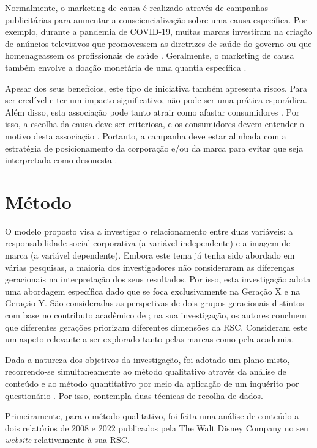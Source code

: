 \documentclass[portuguese]{textolivre}
\begin{document}
Normalmente, o marketing de causa é realizado através de campanhas publicitárias para aumentar a consciencialização sobre uma causa específica. Por exemplo, durante a pandemia de COVID-19, muitas marcas investiram na criação de anúncios televisivos que promovessem as diretrizes de saúde do governo ou que homenageassem os profissionais de saúde \cite{brainstory_agency_como_2020}. Geralmente, o marketing de causa também envolve a doação monetária de uma quantia específica \cite{robinson_choice_2012}.

Apesar dos seus benefícios, este tipo de iniciativa também apresenta riscos. Para ser credível e ter um impacto significativo, não pode ser uma prática esporádica. Além disso, esta associação pode tanto atrair como afastar consumidores \cite{kotler_marketing_2022}. Por isso, a escolha da causa deve ser criteriosa, e os consumidores devem entender o motivo desta associação \cite{kotler_marketing_2022}. Portanto, a campanha deve estar alinhada com a estratégia de posicionamento da corporação e/ou da marca para evitar que seja interpretada como desonesta \cite{schiffman_consumer_2019}.

\section{Método}\label{sec-resumo}
O modelo proposto visa a investigar o relacionamento entre duas variáveis: a responsabilidade social corporativa (a variável independente) e a imagem de marca (a variável dependente). Embora este tema já tenha sido abordado em várias pesquisas, a maioria dos investigadores não consideraram as diferenças geracionais na interpretação dos seus resultados. Por isso, esta investigação adota uma abordagem específica dado que se foca exclusivamente na Geração X e na Geração Y. São consideradas as perspetivas de dois grupos geracionais distintos com base no contributo acadêmico de \textcite{wu_impact_2014}; na sua investigação, os autores concluem que diferentes gerações priorizam diferentes dimensões da RSC. Consideram este um aspeto relevante a ser explorado tanto pelas marcas como pela academia.  

Dada a natureza dos objetivos da investigação, foi adotado um plano misto, recorrendo-se simultaneamente ao método qualitativo através da análise de conteúdo e ao método quantitativo por meio da aplicação de um inquérito por questionário \cite{elo_qualitative_2008}. Por isso, contempla duas técnicas de recolha de dados.

Primeiramente, para o método qualitativo, foi feita uma análise de conteúdo a dois relatórios de 2008 e 2022 publicados pela The Walt Disney Company no seu \textit{website} relativamente à sua RSC. 
\end{document}
